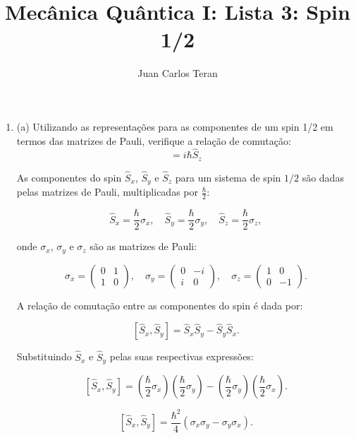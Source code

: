 \documentclass[12pt]{article}
\begin{document}
\author{Juan Carlos Teran}
\title{Mecânica Quântica I: Lista 3: Spin 1/2}
\maketitle

\medskip

\begin{enumerate}

\item
(a) Utilizando as representações para as componentes de um spin 1/2 em termos das matrizes de Pauli, verifique a relação de comutação:
\begin{equation}
  [\hat{S}_x, \hat{S}_y] = i\hbar \hat{S}_z  
\end{equation}

As componentes do spin \(\hat{S}_x\), \(\hat{S}_y\) e \(\hat{S}_z\) para um sistema de spin \(1/2\) são dadas pelas matrizes de Pauli, multiplicadas por \(\frac{\hbar}{2}\):

\[
\hat{S}_x = \frac{\hbar}{2} \sigma_x, \quad \hat{S}_y = \frac{\hbar}{2} \sigma_y, \quad \hat{S}_z = \frac{\hbar}{2} \sigma_z,
\]

onde \(\sigma_x\), \(\sigma_y\) e \(\sigma_z\) são as matrizes de Pauli:

\[
\sigma_x = \begin{pmatrix}
0 & 1 \\
1 & 0
\end{pmatrix}, \quad
\sigma_y = \begin{pmatrix}
0 & -i \\
i & 0
\end{pmatrix}, \quad
\sigma_z = \begin{pmatrix}
1 & 0 \\
0 & -1
\end{pmatrix}.
\]

A relação de comutação entre as componentes do spin é dada por:

\[
[\hat{S}_x, \hat{S}_y] = \hat{S}_x \hat{S}_y - \hat{S}_y \hat{S}_x.
\]

Substituindo \(\hat{S}_x\) e \(\hat{S}_y\) pelas suas respectivas expressões:

\[
[\hat{S}_x, \hat{S}_y] = \left(\frac{\hbar}{2} \sigma_x\right)\left(\frac{\hbar}{2} \sigma_y\right) - \left(\frac{\hbar}{2} \sigma_y\right)\left(\frac{\hbar}{2} \sigma_x\right).
\]

\[
[\hat{S}_x, \hat{S}_y] = \frac{\hbar^2}{4} \left( \sigma_x \sigma_y - \sigma_y \sigma_x \right).
\]


\end{enumerate}
\end{document}
